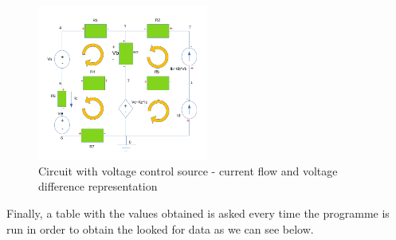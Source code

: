 \begin{figure}[h]
\includegraphics[width=0.5\textwidth]{Esquema_salito.PNG}
\centering
\caption{Circuit with voltage control source - current flow and voltage difference representation}
\label{fig:figure5}
\end{figure}

Finally, a table with the values obtained is asked every time the programme is run in order to obtain the looked for data as we can see below. 





